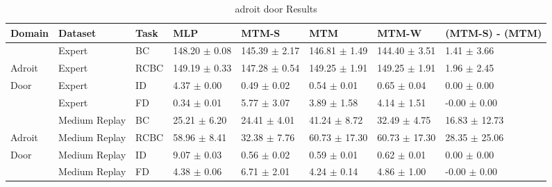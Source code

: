 \begin{table*}
  \small
  \caption{adroit door Results}
  \label{tab:adroit_door}
  \centering
  \begin{tabular}{l l l l l l l l}
    \toprule
Domain &       Dataset & Task &               MLP &             MTM-S &               MTM &             MTM-W &                                  (MTM-S) - (MTM) \\
    \midrule
       &        Expert &   BC & 148.20 $\pm$ 0.08 & 145.39 $\pm$ 2.17 & 146.81 $\pm$ 1.49 & 144.40 $\pm$ 3.51 & \textcolor[rgb]{0.00,0.50,0.00}{1.41 $\pm$ 3.66} \\
Adroit &        Expert & RCBC & 149.19 $\pm$ 0.33 & 147.28 $\pm$ 0.54 & 149.25 $\pm$ 1.91 & 149.25 $\pm$ 1.91 & \textcolor[rgb]{0.00,0.50,0.00}{1.96 $\pm$ 2.45} \\
  Door &        Expert &   ID &   4.37 $\pm$ 0.00 &   0.49 $\pm$ 0.02 &   0.54 $\pm$ 0.01 &   0.65 $\pm$ 0.04 & \textcolor[rgb]{0.00,0.00,0.00}{0.00 $\pm$ 0.00} \\
       &        Expert &   FD &   0.34 $\pm$ 0.01 &   5.77 $\pm$ 3.07 &   3.89 $\pm$ 1.58 &   4.14 $\pm$ 1.51 &                                 -0.00 $\pm$ 0.00 \\
    \midrule
       & Medium Replay &   BC &  25.21 $\pm$ 6.20 &  24.41 $\pm$ 4.01 &  41.24 $\pm$ 8.72 &  32.49 $\pm$ 4.75 &  \textcolor[rgb]{0.0,1.0,0.0}{16.83 $\pm$ 12.73} \\
Adroit & Medium Replay & RCBC &  58.96 $\pm$ 8.41 &  32.38 $\pm$ 7.76 & 60.73 $\pm$ 17.30 & 60.73 $\pm$ 17.30 &  \textcolor[rgb]{0.0,1.0,0.0}{28.35 $\pm$ 25.06} \\
  Door & Medium Replay &   ID &   9.07 $\pm$ 0.03 &   0.56 $\pm$ 0.02 &   0.59 $\pm$ 0.01 &   0.62 $\pm$ 0.01 & \textcolor[rgb]{0.00,0.00,0.00}{0.00 $\pm$ 0.00} \\
       & Medium Replay &   FD &   4.38 $\pm$ 0.06 &   6.71 $\pm$ 2.01 &   4.24 $\pm$ 0.14 &   4.86 $\pm$ 1.00 &                                 -0.00 $\pm$ 0.00 \\
    \midrule
    \bottomrule
  \end{tabular}
\end{table*}
